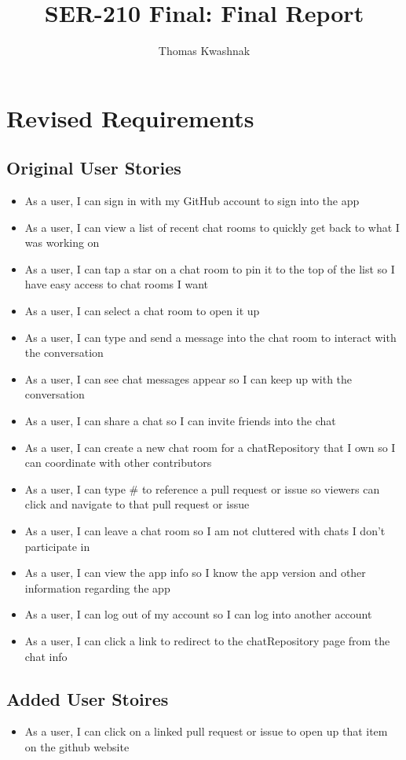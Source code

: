 \documentclass{report}
\title{SER-210 Final: Final Report}
\author{Thomas Kwashnak}
\begin{document}
\maketitle
\tableofcontents
\newpage

\chapter{Revised Requirements}

\section{Original User Stories}
\begin{itemize}
    \item As a user, I can sign in with my GitHub account to sign into the app
    \item As a user, I can view a list of recent chat rooms to quickly get back to what I was working on
    \item As a user, I can tap a star on a chat room to pin it to the top of the list so I have easy access to chat rooms I want
    \item As a user, I can select a chat room to open it up
    \item As a user, I can type and send a message into the chat room to interact with the conversation
    \item As a user, I can see chat messages appear so I can keep up with the conversation
    \item As a user, I can share a chat so I can invite friends into the chat
    \item As a user, I can create a new chat room for a chatRepository that I own so I can coordinate with other contributors
    \item As a user, I can type \# to reference a pull request or issue so viewers can click and navigate to that pull request or issue
    \item As a user, I can leave a chat room so I am not cluttered with chats I don't participate in
    \item As a user, I can view the app info so I know the app version and other information regarding the app
    \item As a user, I can log out of my account so I can log into another account
    \item As a user, I can click a link to redirect to the chatRepository page from the chat info
\end{itemize}
\section{Added User Stoires}
\begin{itemize}
    \item As a user, I can click on a linked pull request or issue to open up that item on the github website
\end{itemize}
\end{document}
